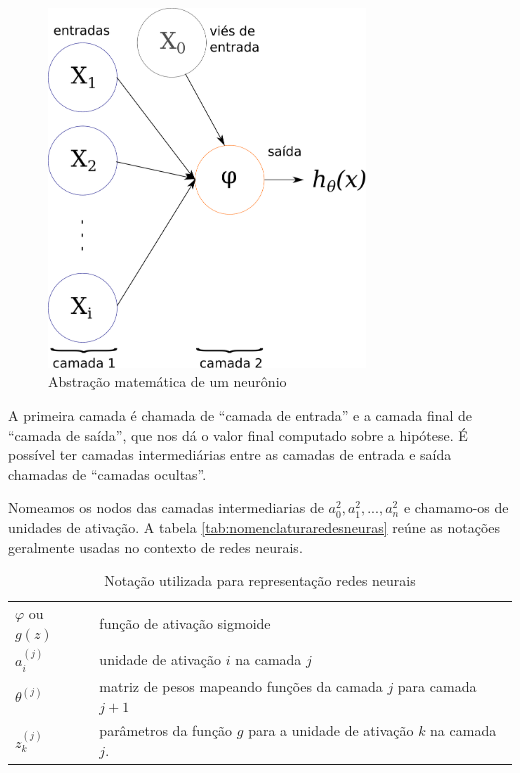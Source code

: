 \begin{figure}
\centering
\caption{Abstração matemática de um neurônio} \label{fig:neuroniomat}
\includegraphics[width=0.75\textwidth]{img/redeneuralmat.pdf}
\end{figure}


A primeira camada é chamada de ``camada de entrada'' e a camada final de ``camada de saída'', que nos dá o valor final computado sobre a hipótese. É possível ter camadas intermediárias entre as camadas de entrada e saída chamadas de ``camadas ocultas''. 

Nomeamos os nodos das camadas intermediarias de $a_0^2, a_1^2, ..., a_n^2$ e chamamo-os de unidades de ativação. A tabela \autoref{tab:nomenclaturaredesneuras} reúne as notações geralmente usadas no contexto de redes neurais.

\begin{table}[!htb]
\caption{Notação utilizada para representação redes neurais} \label{tab:nomenclaturaredesneuras}
\begin{center}
\begin{tabular}{m{2cm}m{12.0cm}}
  \toprule
  $\varphi$ ou $g(z)$ & função de ativação sigmoide\\
  $a_i^{(j)}$ 	   & unidade de ativação $i$ na camada $j$ \\
  $\theta^{(j)}$   & matriz de pesos mapeando funções da camada $j$ para camada $j+1$  \\
  $z_k^{(j)}$	&	parâmetros da função $g$ para a unidade de ativação $k$ na camada $j$. \\
  \bottomrule
\end{tabular}
\end{center}

\end{table}


